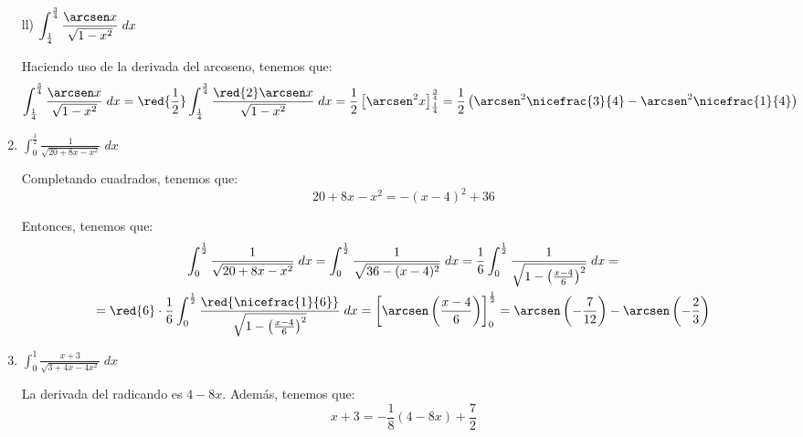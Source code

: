 \begin{ejercicio}
\begin{enumerate}
        \item[ll)] $\displaystyle \int_{\frac{1}{4}}^{\frac{3}{4}} \frac{\arcsen x}{\sqrt{1-x^2}}\;dx$

        Haciendo uso de la derivada del arcoseno, tenemos que:
        \begin{equation*}
            \int_{\frac{1}{4}}^{\frac{3}{4}} \frac{\arcsen x}{\sqrt{1-x^2}}\;dx
            = \red{\frac{1}{2}}\int_{\frac{1}{4}}^{\frac{3}{4}} \frac{\red{2}\arcsen x}{\sqrt{1-x^2}}\;dx
            = \frac{1}{2}\left[\arcsen^2 x\right]_{\frac{1}{4}}^{\frac{3}{4}}
            = \frac{1}{2}\left(\arcsen^2 \nicefrac{3}{4}-\arcsen^2 \nicefrac{1}{4}\right)
        \end{equation*}

        \item $\displaystyle \int_0^{\frac{1}{2}} \frac{1}{\sqrt{20+8x-x^2}}\;dx$
        
        Completando cuadrados, tenemos que:
        \begin{equation*}
            20+8x-x^2 = -(x-4)^2+36
        \end{equation*}

        Entonces, tenemos que:
        \begin{multline*}
            \int_0^{\frac{1}{2}} \frac{1}{\sqrt{20+8x-x^2}}\;dx
            = \int_0^{\frac{1}{2}} \frac{1}{\sqrt{36-(x-4)^2}}\;dx
            = \frac{1}{6} \int_0^{\frac{1}{2}} \frac{1}{\sqrt{1-\left(\frac{x-4}{6}\right)^2}}\;dx
            =\\= \red{6}\cdot \frac{1}{6}\int_0^{\frac{1}{2}} \frac{\red{\nicefrac{1}{6}}}{\sqrt{1-\left(\frac{x-4}{6}\right)^2}}\;dx
            = \left[\arcsen \left(\frac{x-4}{6}\right)\right]_0^{\frac{1}{2}}
            = \arcsen \left(-\frac{7}{12}\right)-\arcsen \left(-\frac{2}{3}\right)
        \end{multline*}

        \item $\displaystyle \int_0^1 \frac{x+3}{\sqrt{3+4x-4x^2}}\;dx$
        
        La derivada del radicando es $4-8x$. Además, tenemos que:
        \begin{equation*}
            x+3 = -\frac{1}{8}(4-8x) +\frac{7}{2}
        \end{equation*}


\end{enumerate}
\end{ejercicio}
